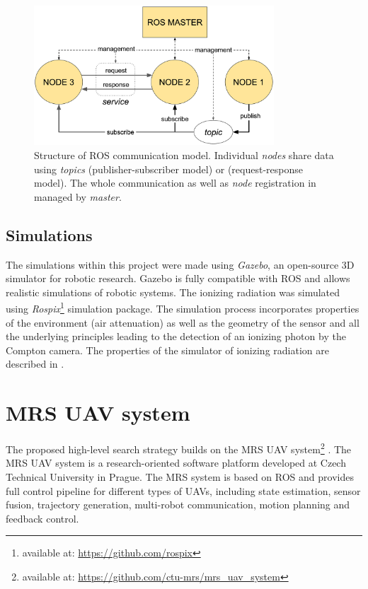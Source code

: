 \begin{figure}[!h]
    \centering
  \includegraphics[width=0.8\textwidth]{./fig/photos/ros_schema.eps}
    \caption{Structure of \ac{ROS} communication model. Individual \textit{nodes} share data using \textit{topics} (publisher-subscriber model) or  (request-response model). The whole communication as well as \textit{node} registration in managed by \textit{master}.}%
\end{figure}

\subsection{Simulations}
The simulations within this project were made using \textit{Gazebo}, an open-source 3D simulator for robotic research.
Gazebo is fully compatible with \ac{ROS} and allows realistic simulations of robotic systems.
The ionizing radiation was simulated using \textit{Rospix}\footnote{available at: \url{https://github.com/rospix}} simulation package.
The simulation process incorporates properties of the environment (air attenuation) as well as the geometry of the sensor and all the underlying principles leading to the detection of an ionizing photon by the Compton camera.
The properties of the simulator of ionizing radiation are described in \cite{baca2019timepix}.

\section{MRS UAV system}
The proposed high-level search strategy builds on the MRS UAV system\footnote{available at: \url{https://github.com/ctu-mrs/mrs_uav_system}} \cite{mrs_system}.
The MRS UAV system is a research-oriented software platform developed at Czech Technical University in Prague.
The MRS system is based on \ac{ROS} and provides full control pipeline for different types of \ac{UAV}s, including state estimation, sensor fusion, trajectory generation, multi-robot communication, motion planning and feedback control.


